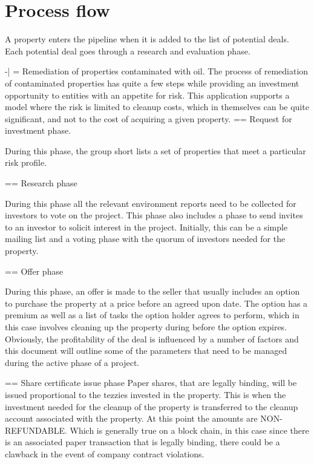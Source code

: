 \documentclass{article}
\begin{document}
\pagestyle{empty}
\section{Process flow} 
A property enters the pipeline when it is added to the list of potential deals. Each potential deal goes through a research and evaluation phase.


{-|
  = Remediation of properties contaminated with oil.
  The process of remediation of contaminated properties has quite a few
  steps while providing an investment opportunity to entities with an 
  appetite for risk. This application supports a model where the risk is limited 
  to cleanup costs, which in themselves can be quite significant, and not to the cost
  of acquiring a given property. 
  == Request for investment phase.

  During this phase, the group short lists a set of properties that meet a particular risk profile. 

  == Research phase 

  During this phase all the relevant environment reports need to be collected for investors to vote on the project. This phase also includes a phase to send invites to an investor to solicit interest in the project. Initially, 
  this can be a simple mailing list and a voting phase with the quorum of investors needed for the property.

  == Offer phase 

  During this phase, an offer is made to the seller that usually includes an option to purchase the property at a price before an agreed upon date. The option has a premium as well as a list of tasks the option holder agrees to perform, which in this case involves cleaning up the property during before the option expires. Obviously, the profitability of the deal is influenced by a number of factors and this document will outline some of the parameters that need to be managed during the active phase of a project.

  == Share certificate issue phase 
  Paper shares, that are legally binding, will be issued proportional to the tezzies invested 
  in the property. This is when the investment needed for the cleanup of the property is transferred
  to the cleanup account associated with the property. At this point the amounts are NON-REFUNDABLE.
  Which is generally true on a block chain, in this case since there is an associated paper transaction 
  that is legally binding, there could be a clawback in the event of company contract violations.

}
\end{document}
